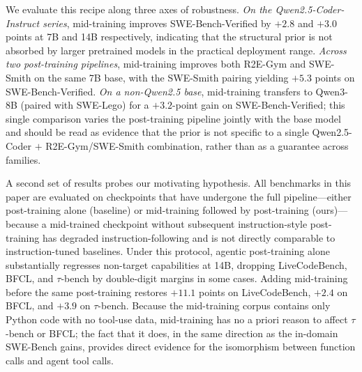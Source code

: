 We evaluate this recipe along three axes of robustness. \emph{On the
Qwen2.5-Coder-Instruct series}, mid-training improves SWE-Bench-Verified
by $+2.8$ and $+3.0$ points at 7B and 14B respectively, indicating that
the structural prior is not absorbed by larger pretrained models in the
practical deployment range. \emph{Across two post-training pipelines},
mid-training improves both R2E-Gym and SWE-Smith on the same 7B base,
with the SWE-Smith pairing yielding $+5.3$ points on SWE-Bench-Verified.
\emph{On a non-Qwen2.5 base}, mid-training transfers to Qwen3-8B (paired
with SWE-Lego) for a $+3.2$-point gain on SWE-Bench-Verified; this single
comparison varies the post-training pipeline jointly with the base model
and should be read as evidence that the prior is not specific to a single
Qwen2.5-Coder $+$ R2E-Gym/SWE-Smith combination, rather than as a
guarantee across families.

A second set of results probes our motivating hypothesis. All benchmarks
in this paper are evaluated on checkpoints that have undergone the full
pipeline---either post-training alone (baseline) or mid-training followed
by post-training (ours)---because a mid-trained checkpoint without
subsequent instruction-style post-training has degraded
instruction-following and is not directly comparable to instruction-tuned
baselines. Under this protocol, agentic post-training alone substantially
regresses non-target capabilities at 14B, dropping LiveCodeBench, BFCL,
and $\tau$-bench by double-digit margins in some cases. Adding
mid-training before the same post-training restores
$+11.1$ points on LiveCodeBench, $+2.4$ on BFCL, and $+3.9$ on
$\tau$-bench. Because the mid-training corpus contains only Python code
with no tool-use data, mid-training has no a priori reason to affect
$\tau$-bench or BFCL; the fact that it does, in the same direction as the
in-domain SWE-Bench gains, provides direct evidence for the isomorphism
between function calls and agent tool calls.

